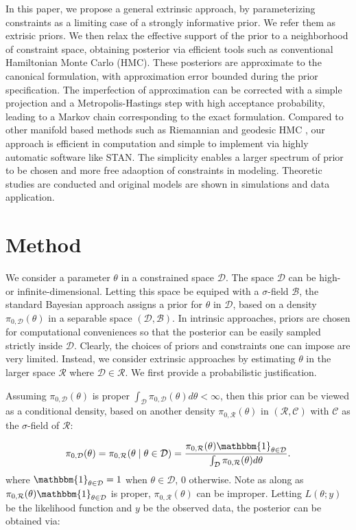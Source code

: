 \documentclass[10pt]{article}
\newcommand{\mc}[1]{\mathcal{#1}}
\begin{document}
In this paper, we propose a general extrinsic approach, by parameterizing constraints as a limiting case of a strongly informative prior. We refer them as extrisic priors. We then relax the effective support of the prior to a neighborhood of constraint space, obtaining posterior via efficient tools such as conventional Hamiltonian Monte Carlo (HMC). These posteriors are approximate to the canonical formulation, with approximation error bounded during the prior specification. The imperfection of approximation can be corrected with a simple projection and a Metropolis-Hastings step with high acceptance probability, leading to a Markov chain corresponding to the exact formulation. Compared to other manifold based methods such as Riemannian and geodesic HMC \citep{girolami2011riemann,byrne2013geodesic}, our approach is efficient in computation and simple to implement via highly automatic software like STAN. The simplicity enables a larger spectrum of prior to be chosen and more free adaoption of constraints in modeling. Theoretic studies are conducted and original models are shown in simulations and data application.

\section{Method}

We consider a parameter $\theta$ in a constrained space $\mc D$. The space $\mc D$ can be high- or infinite-dimensional. Letting this space be equiped with a $\sigma$-field $\mathscr B$, the standard Bayesian approach assigns a prior for $\theta$ in $\mc D$, based on a density $\pi_{0,\mc D}(\theta)$ in a separable space $(\mc D, \mathscr B)$. In intrinsic approaches, priors are chosen for computational conveniences so that the posterior can be easily sampled strictly inside $\mc D$. Clearly, the choices of priors and constraints one can impose are very limited. Instead, we consider extrinsic approaches by estimating $\theta$ in the larger space $\mc R$ where $\mc D\in \mc R$. We first provide a probabilistic justification.


Assuming $\pi_{0,\mc D}(\theta)$ is proper $\int_{\mc D} \pi_{0,\mc D}(\theta) d\theta <\infty$, then this prior can be viewed as a conditional density, based on another density $\pi_{0,\mc R}(\theta)$ in $(\mc R, \mathscr C)$ with $\mathscr C$ as the $\sigma$-field of $\mc R$:

\begin{equation}
\begin{aligned}
\pi_{0,\mc D}(\theta)= \pi_{0,\mc R}(\theta \mid \theta \in \mc D) = \frac{ \pi_{0,\mc R}(\theta) \mathbbm{1}_{\theta\in \mc D} }{ \int_{\mc D}  \pi_{0,\mc R}(\theta)d\theta }.
\end{aligned}
\end{equation}
where $\mathbbm{1}_{\theta \in \mc D}=1$ when $\theta \in \mc D$, $0$ otherwise. Note  as along as $\pi_{0,\mc R}(\theta) \mathbbm{1}_{\theta\in \mc D}$ is proper, $\pi_{0,\mc R}(\theta)$ can be improper. Letting $L(\theta;y)$ be the likelihood function and $y$ be the observed data, the posterior can be obtained via:
\end{document}
